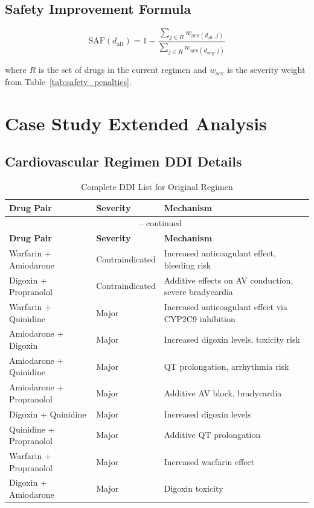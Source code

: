 \documentclass[11pt,a4paper]{article}
\begin{document}
\subsection{Safety Improvement Formula}
\begin{equation}
\text{SAF}(d_{\text{alt}}) = 1 - \frac{\sum_{j \in R} w_{\text{sev}(d_{\text{alt}}, j)}}{\sum_{j \in R} w_{\text{sev}(d_{\text{orig}}, j)}}
\end{equation}

where $R$ is the set of drugs in the current regimen and $w_{\text{sev}}$ is the severity weight from Table~\ref{tab:safety_penalties}.

\section{Case Study Extended Analysis}

\subsection{Cardiovascular Regimen DDI Details}

\begin{longtable}{llp{6cm}}
\caption{Complete DDI List for Original Regimen} \label{tab:ddi_details} \\
\toprule
\textbf{Drug Pair} & \textbf{Severity} & \textbf{Mechanism} \\
\midrule
\endfirsthead
\multicolumn{3}{c}{\tablename\ \thetable{} -- continued} \\
\toprule
\textbf{Drug Pair} & \textbf{Severity} & \textbf{Mechanism} \\
\midrule
\endhead
\bottomrule
\endfoot
Warfarin + Amiodarone & Contraindicated & Increased anticoagulant effect, bleeding risk \\
Digoxin + Propranolol & Contraindicated & Additive effects on AV conduction, severe bradycardia \\
Warfarin + Quinidine & Major & Increased anticoagulant effect via CYP2C9 inhibition \\
Amiodarone + Digoxin & Major & Increased digoxin levels, toxicity risk \\
Amiodarone + Quinidine & Major & QT prolongation, arrhythmia risk \\
Amiodarone + Propranolol & Major & Additive AV block, bradycardia \\
Digoxin + Quinidine & Major & Increased digoxin levels \\
Quinidine + Propranolol & Major & Additive QT prolongation \\
Warfarin + Propranolol & Major & Increased warfarin effect \\
Digoxin + Amiodarone & Major & Digoxin toxicity \\
\end{longtable}
\end{document}
